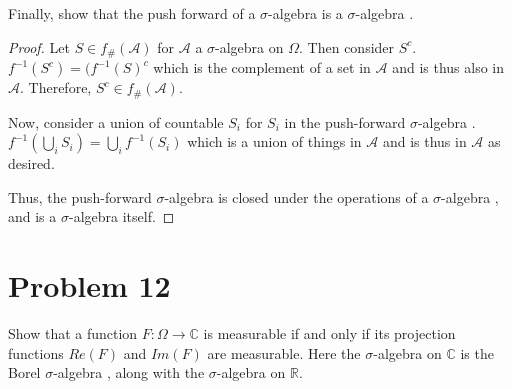 \documentclass[paper=a4, fontsize=11pt]{scrartcl} %
\numberwithin{equation}{section} %
\numberwithin{figure}{section} %
\numberwithin{table}{section} %
\newcommand{\sigalg}{$\sigma$-algebra }
\begin{document}
Finally, show that the push forward of a \sigalg is a \sigalg.

\begin{proof}
Let $S\in f_\#(\mathscr{A})$ for $\mathscr{A}$ a \sigalg on $\Omega$. Then
consider $S^c$. $f^{-1}(S^c) = (f^{-1}(S)^c$ which is the complement of
a set in $\mathscr{A}$ and is thus also in $\mathscr{A}$. Therefore, $S^c\in f_\#(\mathscr{A})$.

Now, consider a union of countable $S_i$ for $S_i$ in the push-forward \sigalg.
$f^{-1}(\bigcup_i S_i) = \bigcup_i f^{-1}(S_i)$ which is a union of things in $\mathscr{A}$
and is thus in $\mathscr{A}$ as desired.

Thus, the push-forward \sigalg is closed under the operations of a \sigalg, and is
a \sigalg itself.
\end{proof}


\section*{Problem 12}
Show that a function $F:\Omega\to\mathbb{C}$ is measurable if and only if its projection
functions $Re(F)$ and $Im(F)$ are measurable. Here the \sigalg on $\mathbb{C}$ is the 
Borel \sigalg, along with the \sigalg on $\mathbb{R}$.
\end{document}
